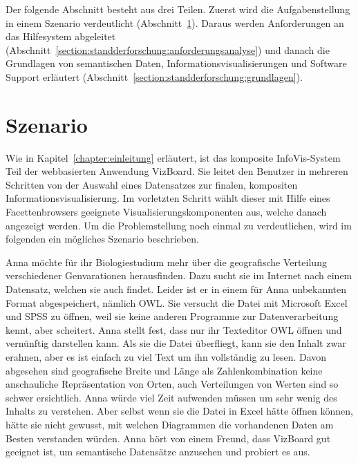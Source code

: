 \documentclass[
	headsepline,
	footsepline,
	fontsize=12pt,
	bibliography=totoc
]{scrbook}
\begin{document}
Der folgende Abschnitt besteht aus drei Teilen. Zuerst wird die Aufgabenstellung in einem Szenario verdeutlicht (Abschnitt~\ref{section:standderforschung:szenario}). Daraus werden Anforderungen an das Hilfesystem abgeleitet (Abschnitt~\ref{section:standderforschung:anforderungsanalyse}) und danach die Grundlagen von semantischen Daten, Informationsvisualisierungen und Software Support erläutert (Abschnitt~\ref{section:standderforschung:grundlagen}).

\section{Szenario}
\label{section:standderforschung:szenario}


Wie in Kapitel~\ref{chapter:einleitung} erläutert, ist das komposite InfoVis-System Teil der webbasierten Anwendung VizBoard. Sie leitet den Benutzer in mehreren Schritten von der Auswahl eines Datensatzes zur finalen, kompositen Informationsvisualisierung. Im vorletzten Schritt wählt dieser mit Hilfe eines Facettenbrowsers geeignete Visualisierungskomponenten aus, welche danach angezeigt werden. Um die Problemstellung noch einmal zu verdeutlichen, wird im folgenden ein mögliches Szenario beschrieben.

Anna möchte für ihr Biologiestudium mehr über die geografische Verteilung verschiedener Genvarationen herausfinden. Dazu sucht sie im Internet nach einem Datensatz, welchen sie auch findet. 
Leider ist er in einem für Anna unbekannten Format abgespeichert, nämlich OWL. Sie versucht die Datei mit Microsoft Excel und SPSS zu öffnen, weil sie keine anderen Programme zur Datenverarbeitung kennt, aber scheitert. Anna stellt fest, dass nur ihr Texteditor OWL öffnen und vernünftig darstellen kann. Als sie die Datei überfliegt, kann sie den Inhalt zwar erahnen, aber es ist einfach zu viel Text um ihn vollständig zu lesen. Davon abgesehen sind geografische Breite und Länge als Zahlenkombination keine anschauliche Repräsentation von Orten, auch Verteilungen von Werten sind so schwer ersichtlich. Anna würde viel Zeit aufwenden müssen um sehr wenig des Inhalts zu verstehen. Aber selbst wenn sie die Datei in Excel hätte öffnen können, hätte sie nicht gewusst, mit welchen Diagrammen die vorhandenen Daten am Besten verstanden würden. Anna hört von einem Freund, dass VizBoard gut geeignet ist, um semantische Datensätze anzusehen und probiert es aus.
\end{document}

